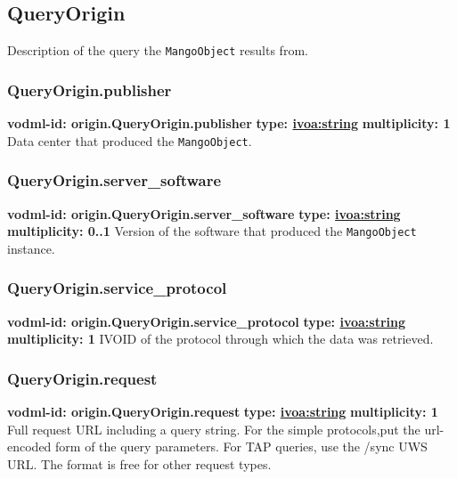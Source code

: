   \subsection{QueryOrigin}
    \label{sect:origin.QueryOrigin}
    Description of the query the \texttt{MangoObject} results from.

    \subsubsection{QueryOrigin.publisher}
    \textbf{vodml-id: origin.QueryOrigin.publisher} \newline
    \textbf{type: \hyperref[sect:ivoa]{ivoa:string}} \newline
    \textbf{multiplicity: 1} \newline
    Data center that produced the \texttt{MangoObject}.

    \subsubsection{QueryOrigin.server\_software}
    \textbf{vodml-id: origin.QueryOrigin.server\_software} \newline
    \textbf{type: \hyperref[sect:ivoa]{ivoa:string}} \newline
    \textbf{multiplicity: 0..1} \newline
    Version of the software that produced the \texttt{MangoObject} instance.

    \subsubsection{QueryOrigin.service\_protocol}
    \textbf{vodml-id: origin.QueryOrigin.service\_protocol} \newline
    \textbf{type: \hyperref[sect:ivoa]{ivoa:string}} \newline
    \textbf{multiplicity: 1} \newline
    IVOID \citep{2007ivoa.spec.0314P} of the protocol through which the data was retrieved.

    \subsubsection{QueryOrigin.request}
    \textbf{vodml-id: origin.QueryOrigin.request} \newline
    \textbf{type: \hyperref[sect:ivoa]{ivoa:string}} \newline
    \textbf{multiplicity: 1} \newline
    Full request URL including a query string. For the simple protocols,put the url-encoded form of the query parameters. For TAP queries, use the /sync UWS \citep{2016ivoa.spec.1024H} URL. The format is free for other request types.

